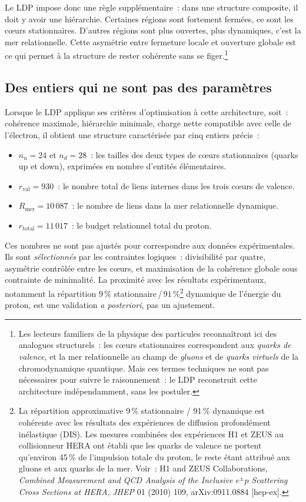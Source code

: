 \documentclass[12pt, a4paper, openright]{book}
\begin{document}
\medskip

Le LDP impose donc une règle supplémentaire~: dans une structure composite, il doit y avoir une hiérarchie. Certaines régions sont fortement fermées, ce sont les c\oe{}urs stationnaires. D'autres régions sont plus ouvertes, plus dynamiques, c'est la mer relationnelle. Cette asymétrie entre fermeture locale et ouverture globale est ce qui permet à la structure de rester cohérente sans se figer.\footnote{Les lecteurs familiers de la physique des particules reconnaîtront ici des analogues structurels~: les c\oe{}urs stationnaires correspondent aux \emph{quarks de valence}, et la mer relationnelle au champ de \emph{gluons} et de \emph{quarks virtuels} de la chromodynamique quantique. Mais ces termes techniques ne sont pas nécessaires pour suivre le raisonnement~: le LDP reconstruit cette architecture indépendamment, sans les postuler.}

\subsection*{Des entiers qui ne sont pas des paramètres}

Lorsque le LDP applique ses critères d'optimisation à cette architecture, soit~: cohérence maximale, hiérarchie minimale, charge nette compatible avec celle de l'électron, il obtient une structure caractérisée par cinq entiers précis~:

\begin{itemize}
\item $n_u = 24$ et $n_d = 28$~: les tailles des deux types de c\oe{}urs stationnaires (quarks up et down), exprimées en nombre d'entités élémentaires.
\item $r_{\text{val}} = 930$~: le nombre total de liens internes dans les trois c\oe{}urs de valence.
\item $R_{\text{mer}} = 10\,087$~: le nombre de liens dans la mer relationnelle dynamique.
\item $r_{\text{total}} = 11\,017$~: le budget relationnel total du proton.
\end{itemize}

Ces nombres ne sont pas ajustés pour correspondre aux données expérimentales. Ils sont \emph{sélectionnés} par les contraintes logiques~: divisibilité par quatre, asymétrie contrôlée entre les c\oe{}urs, et maximisation de la cohérence globale sous contrainte de minimalité. La proximité avec les résultats expérimentaux, notamment la répartition $9\,\%$ stationnaire\,/\,$91\,\%$\footnote{La répartition approximative 9\,\% stationnaire / 91\,\% dynamique est cohérente avec les résultats des expériences de diffusion profondément inélastique (DIS). Les mesures combinées des expériences H1 et ZEUS au collisionneur HERA ont établi que les quarks de valence ne portent qu'environ 45\,\% de l'impulsion totale du proton, le reste étant attribué aux gluons et aux quarks de la mer. Voir~: H1 and ZEUS Collaborations, \textit{Combined Measurement and QCD Analysis of the Inclusive $e^{\pm}p$ Scattering Cross Sections at HERA}, \textit{JHEP} 01 (2010) 109, arXiv:0911.0884 [hep-ex].} dynamique de l'énergie du proton, est une validation \emph{a posteriori}, pas un ajustement.
\end{document}
